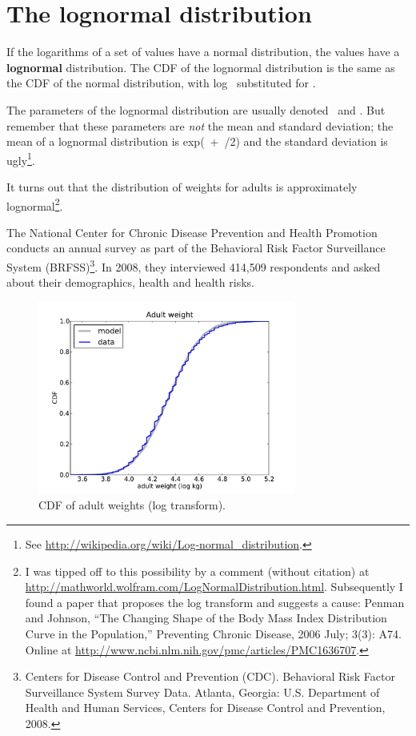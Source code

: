 \documentclass[12pt]{book}
\begin{document}
\section{The lognormal distribution}
\label{lognormal}

If the logarithms of a set of values have a normal distribution, the
values have a {\bf lognormal} distribution.  The CDF of the lognormal
distribution is the same as the CDF of the normal distribution,
with log \x~substituted for \x.

 
The parameters of the lognormal distribution are usually denoted
\mymu~and \mysigma.  But remember that these parameters are {\em not}
the mean and standard deviation; the mean of a lognormal distribution
is exp(\mymu~+~\sigmasq/2) and the standard deviation is
ugly\footnote{See \url{http://wikipedia.org/wiki/Log-normal_distribution}.}.
  

It turns out that the distribution of weights for adults is
approximately lognormal\footnote{I was tipped off to this possibility by a
  comment (without citation) at
  \url{http://mathworld.wolfram.com/LogNormalDistribution.html}.
  Subsequently I found a paper that proposes the log transform and
  suggests a cause: Penman and Johnson, ``The Changing Shape of the
  Body Mass Index Distribution Curve in the Population,'' Preventing
  Chronic Disease, 2006 July; 3(3): A74.  Online
  at \url{http://www.ncbi.nlm.nih.gov/pmc/articles/PMC1636707}.}.

The National Center for Chronic Disease
Prevention and Health Promotion conducts an annual survey as part of
the Behavioral Risk Factor Surveillance System
(BRFSS)\footnote{Centers for Disease Control and Prevention
  (CDC). Behavioral Risk Factor Surveillance System Survey
  Data. Atlanta, Georgia: U.S. Department of Health and Human
  Services, Centers for Disease Control and Prevention, 2008.}.  In
2008, they interviewed 414,509 respondents and asked about their
demographics, health and health risks.


\begin{figure}
\centerline{
\includegraphics[height=2.5in]{figs/brfss_weight_log.pdf}
}
\caption{CDF of adult weights (log
  transform).}
\label{brfss_weight_log}
\end{figure}
\end{document}

